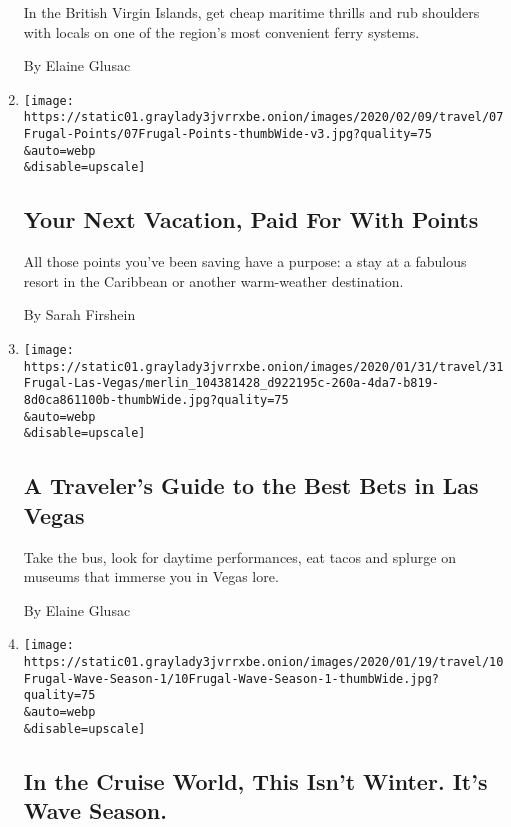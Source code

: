 \begin{enumerate}
  In the British Virgin Islands, get cheap maritime thrills and rub
  shoulders with locals on one of the region's most convenient ferry
  systems.

  By Elaine Glusac
\item
  \href{/2020/02/07/travel/budget-travel-caribbean-credit-card-points.html}{}

  \texttt{[image: https://static01.graylady3jvrrxbe.onion/images/2020/02/09/travel/07Frugal-Points/07Frugal-Points-thumbWide-v3.jpg?quality=75\\\&auto=webp\\\&disable=upscale]}

  \hypertarget{your-next-vacation-paid-for-with-points}{%
  \subsection{Your Next Vacation, Paid For With
  Points}\label{your-next-vacation-paid-for-with-points}}

  All those points you've been saving have a purpose: a stay at a
  fabulous resort in the Caribbean or another warm-weather destination.

  By Sarah Firshein
\item
  \href{/2020/01/31/travel/Las-vegas-budget-travel.html}{}

  \texttt{[image: https://static01.graylady3jvrrxbe.onion/images/2020/01/31/travel/31Frugal-Las-Vegas/merlin\_104381428\_d922195c-260a-4da7-b819-8d0ca861100b-thumbWide.jpg?quality=75\\\&auto=webp\\\&disable=upscale]}

  \hypertarget{a-travelers-guide-to-the-best-bets-in-las-vegas}{%
  \subsection{A Traveler's Guide to the Best Bets in Las
  Vegas}\label{a-travelers-guide-to-the-best-bets-in-las-vegas}}

  Take the bus, look for daytime performances, eat tacos and splurge on
  museums that immerse you in Vegas lore.

  By Elaine Glusac
\item
  \href{/2020/01/10/travel/cruises-budget-travel.html}{}

  \texttt{[image: https://static01.graylady3jvrrxbe.onion/images/2020/01/19/travel/10Frugal-Wave-Season-1/10Frugal-Wave-Season-1-thumbWide.jpg?quality=75\\\&auto=webp\\\&disable=upscale]}

  \hypertarget{in-the-cruise-world-this-isnt-winter-its-wave-season}{%
  \subsection{In the Cruise World, This Isn't Winter. It's Wave
  Season.}\label{in-the-cruise-world-this-isnt-winter-its-wave-season}}


\end{enumerate}
